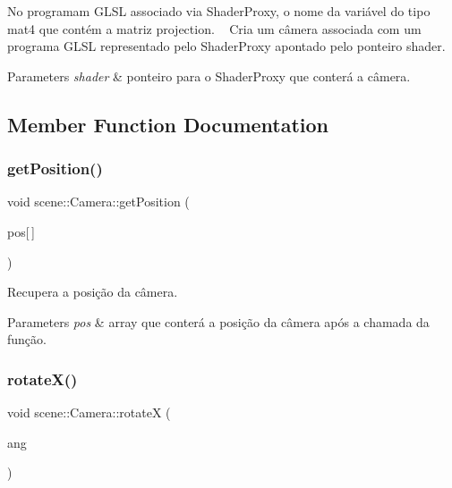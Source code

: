 No programam G\+L\+SL associado via Shader\+Proxy, o nome da variável do tipo mat4 que contém a matriz projection. ~\newline
Cria um câmera associada com um programa G\+L\+SL representado pelo Shader\+Proxy apontado pelo ponteiro {\ttfamily shader}. 
\begin{DoxyParams}{Parameters}
{\em shader} & ponteiro para o Shader\+Proxy que conterá a câmera. \\
\hline
\end{DoxyParams}


\subsection{Member Function Documentation}
\mbox{\label{classscene_1_1_camera_a069e3e526252f3b46f46f4e131187f97}} 
\subsubsection{\texorpdfstring{get\+Position()}{getPosition()}}
{\footnotesize\ttfamily void scene\+::\+Camera\+::get\+Position (\begin{DoxyParamCaption}\item[{G\+Lfloat}]{pos\mbox{[}$\,$\mbox{]} }\end{DoxyParamCaption})\hspace{0.3cm}{\ttfamily [inline]}}

Recupera a posição da câmera. 
\begin{DoxyParams}{Parameters}
{\em pos} & array que conterá a posição da câmera após a chamada da função. \\
\hline
\end{DoxyParams}
\mbox{\label{classscene_1_1_camera_a9471a8e5dcf3d6ad43b2199e6c069740}} 
\subsubsection{\texorpdfstring{rotate\+X()}{rotateX()}}
{\footnotesize\ttfamily void scene\+::\+Camera\+::rotateX (\begin{DoxyParamCaption}\item[{G\+Lfloat}]{ang }\end{DoxyParamCaption})\hspace{0.3cm}{\ttfamily [inline]}}


